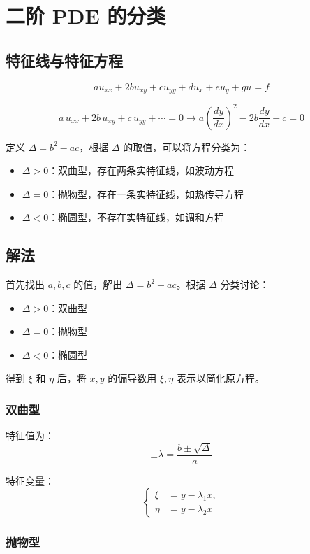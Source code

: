 \section{二阶 PDE 的分类}

\subsection{特征线与特征方程}
\[
a u_{xx} + 2b u_{xy} + c u_{yy} + d u_x + e u_y + g u = f
\]

\[
a \, u_{xx} + 2b \, u_{xy} + c \, u_{yy} + \cdots = 0 \rightarrow a \left( \frac{dy}{dx} \right)^2 - 2b \frac{dy}{dx} + c = 0
\]

定义 $\Delta = b^2 - ac$，根据 $\Delta$ 的取值，可以将方程分类为：
\begin{itemize}
    \item $\Delta > 0$：双曲型，存在两条实特征线，如波动方程
    \item $\Delta = 0$：抛物型，存在一条实特征线，如热传导方程
    \item $\Delta < 0$：椭圆型，不存在实特征线，如调和方程
\end{itemize}

\subsection{解法}
首先找出 $a, b, c$ 的值，解出 $\Delta = b^2 - ac$。根据 $\Delta$ 分类讨论：
\begin{itemize}
    \item $\Delta > 0$：双曲型
    \item $\Delta = 0$：抛物型
    \item $\Delta < 0$：椭圆型
\end{itemize}

得到 $\xi$ 和 $\eta$ 后，将 $x, y$ 的偏导数用 $\xi, \eta$ 表示以简化原方程。

\subsubsection{双曲型}

特征值为：
\[
\pm \lambda = \frac{b \pm \sqrt{\Delta}}{a}
\]

特征变量：
\[
\left\{
\begin{aligned}
\xi &= y - \lambda_1 x, \\
\eta &= y - \lambda_2 x
\end{aligned}
\right.
\]

\subsubsection{抛物型}

